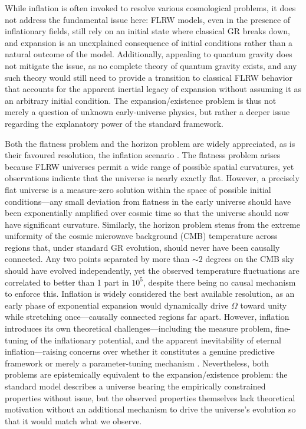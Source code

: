 \documentclass[aps,prd,reprint,superscriptaddress]{revtex4-2}
\begin{document}
While inflation is often invoked to resolve various cosmological problems, it does not address the fundamental issue here: FLRW models, even in the presence of inflationary fields, still rely on an initial state where classical GR breaks down, and expansion is an unexplained consequence of initial conditions rather than a natural outcome of the model. Additionally, appealing to quantum gravity does not mitigate the issue, as no complete theory of quantum gravity exists, and any such theory would still need to provide a transition to classical FLRW behavior that accounts for the apparent inertial legacy of expansion without assuming it as an arbitrary initial condition. The expansion/existence problem is thus not merely a question of unknown early-universe physics, but rather a deeper issue regarding the explanatory power of the standard framework.

Both the flatness problem and the horizon problem are widely appreciated, as is their favoured resolution, the inflation scenario \cite{Guth1981,Linde1982,Linde1983,Albrecht1982}. The flatness problem arises because FLRW universes permit a wide range of possible spatial curvatures, yet observations indicate that the universe is nearly exactly flat. However, a precisely flat universe is a measure-zero solution within the space of possible initial conditions---any small deviation from flatness in the early universe should have been exponentially amplified over cosmic time so that the universe should now have significant curvature. Similarly, the horizon problem stems from the extreme uniformity of the cosmic microwave background (CMB) temperature across regions that, under standard GR evolution, should never have been causally connected. Any two points separated by more than $\sim 2$ degrees on the CMB sky should have evolved independently, yet the observed temperature fluctuations are correlated to better than 1 part in $10^5$, despite there being no causal mechanism to enforce this. Inflation is widely considered the best available resolution, as an early phase of exponential expansion would dynamically drive $\Omega$ toward unity while stretching once---causally connected regions far apart. However, inflation introduces its own theoretical challenges---including the measure problem, fine-tuning of the inflationary potential, and the apparent inevitability of eternal inflation---raising concerns over whether it constitutes a genuine predictive framework or merely a parameter-tuning mechanism \cite{Ijjas2014, Ijjas2017}. Nevertheless, both problems are epistemically equivalent to the expansion/existence problem: the standard model describes a universe bearing the empirically constrained properties without issue, but the observed properties themselves lack theoretical motivation without an additional mechanism to drive the universe's evolution so that it would match what we observe.
\end{document}
